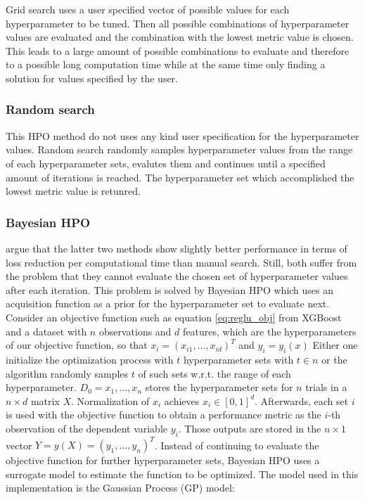 \documentclass[12pt,a4paper]{article}
\begin{document}
Grid search uses a user specified vector of possible values for each hyperparameter to be tuned. Then all possible combinations of hyperparameter values are evaluated and the combination with the lowest metric value is chosen. This leads to a large amount of possible combinations to evaluate and therefore to a possible long computation time while at the same time only finding a solution for values specified by the user.

\hypertarget{random-search}{%
\subsubsection{Random search}\label{random-search}}

This HPO method do not uses any kind user specification for the hyperparameter values. Random search randomly samples hyperparameter values from the range of each hyperparameter sets, evalutes them and continues until a specified amount of iterations is reached. The hyperparameter set which accomplished the lowest metric value is retunred.

\hypertarget{bayesian-hpo}{%
\subsubsection{Bayesian HPO}\label{bayesian-hpo}}

\textcite{Bergstra2012} argue that the latter two methods show slightly better performance in terms of loss reduction per computational time than manual search. Still, both suffer from the problem that they cannot evaluate the chosen set of hyperparameter values after each iteration. This problem is solved by Bayesian HPO which uses an acquisition function as a prior for the hyperparameter set to evaluate next. Consider an objective function such as equation \ref{eq:reglu_obj} from XGBoost and a dataset with \(n\) observations and \(d\) features, which are the hyperparameters of our objective function, so that \(x_i = (x_{i1},\ldots,x_{id})^T\) and \(y_i = y_i(x)\) Either one initialize the optimization process with \(t\) hyperparameter sets with \(t\in n\) or the algorithm randomly samples \(t\) of such sets w.r.t. the range of each hyperparameter. \(D_0 = {x_1,\ldots,x_n}\) stores the hyperparameter sets for \(n\) trials in a \(n \times d\) matrix \(X\). Normalization of \(x_i\) achieves \(x_i \in [0, 1]^d\). Afterwards, each set \(i\) is used with the objective function to obtain a performance metric as the \(i\)-th observation of the dependent variable \(y_i\). Those outputs are stored in the \(n \times 1\) vector \(Y = y(X) = (y_1,\ldots,y_n)^T\). Instead of continuing to evaluate the objective function for further hyperparameter sets, Bayesian HPO uses a surrogate model to estimate the function to be optimized. The model used in this implementation is the Gaussian Process (GP) model:
\end{document}

